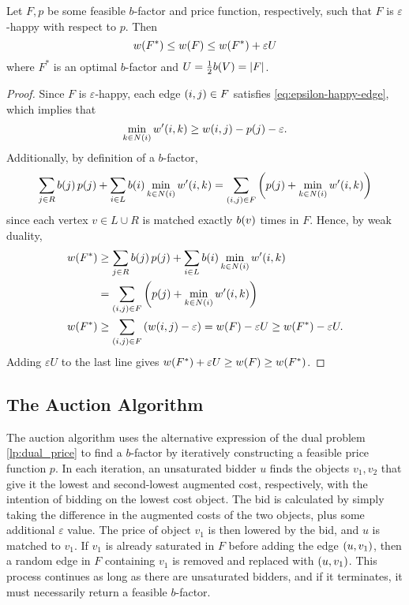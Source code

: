 \begin{lemma}
    Let $F, p$ be some feasible $b$-factor and price function, respectively, such that $F$ is $\varepsilon$-happy with respect to $p$. Then 
    \begin{equation*}
        \f[w]{F^{\ast}} \leq \f[w]{F} \leq \f[w]{F^{\ast}} + \varepsilon U
    \end{equation*}
    where $F^{\ast}$ is an optimal $b$-factor and $U = \frac{1}{2} \f[b]{V} = \abs{F}$. 
    \label{lem:additve_loss}
\end{lemma}
\begin{proof}
    Since $F$ is $\varepsilon$-happy, each edge $\lrp{i, j} \in F$ satisfies \cref{eq:epsilon-happy-edge}, which implies that 
    \begin{equation*}
        \min_{k \in N(i)} \f[w^\prime]{i, k} \geq \f[w]{i, j} - \f[p]{j} - \varepsilon. 
    \end{equation*}
    Additionally, by definition of a $b$-factor, 
    \begin{equation*}
        \sum_{j \in R}  \f[b]{j} \f[p]{j} +  \sum_{i \in L}  \f[b]{i} \min_{k \in N(i)} \f[w^\prime]{i, k} = \sum_{(i, j) \in F} \lrp{\f[p]{j} + \min_{k \in N(i)} \f[w^\prime]{i, k}}
    \end{equation*}
    since each vertex $v \in L \cup R$ is matched exactly $\f[b]{v}$ times in $F$. 
    Hence, by weak duality, 
    \begin{align*}
        \f[w]{F^{\ast}} &\geq \sum_{j \in R}  \f[b]{j} \f[p]{j} +  \sum_{i \in L}  \f[b]{i} \min_{k \in N(i)} \f[w^\prime]{i, k}\\
        &= \sum_{(i, j) \in F} \lrp{\f[p]{j} + \min_{k \in N(i)} \f[w^\prime]{i, k}} \\
        \f[w]{F^{\ast}} &\geq  \sum_{(i, j) \in F} \lrp{\f[w]{i, j} - \varepsilon} = \f[w]{F} - \varepsilon U \geq \f[w]{F^{\ast}} - \varepsilon U. 
    \end{align*}
    Adding $\varepsilon U$ to the last line gives $\f[w]{F^{\ast}} + \varepsilon U \geq \f[w]{F} \geq \f[w]{F^{\ast}}$.
\end{proof}

\subsection{The Auction Algorithm}

The auction algorithm uses the alternative expression of the dual problem \cref{lp:dual_price} to find a $b$-factor by iteratively constructing a 
feasible price function $p$. In each iteration, an unsaturated bidder $u$ finds the objects $v_1, v_2$ that give it the lowest and second-lowest augmented cost, respectively, 
with the intention of bidding on the lowest cost object. The bid is calculated by simply taking the difference in the augmented costs of the two objects, plus some additional $\varepsilon$ value.
The price of object $v_1$ is then lowered by the bid, and $u$ is matched to $v_1$. If $v_1$ is already saturated in $F$ before adding the edge $\lrp{u, v_1}$, then a random 
edge in $F$ containing $v_1$ is removed and replaced with $\lrp{u, v_1}$. This process continues as long as there are unsaturated bidders, and if it 
terminates, it must necessarily return a feasible $b$-factor. 

